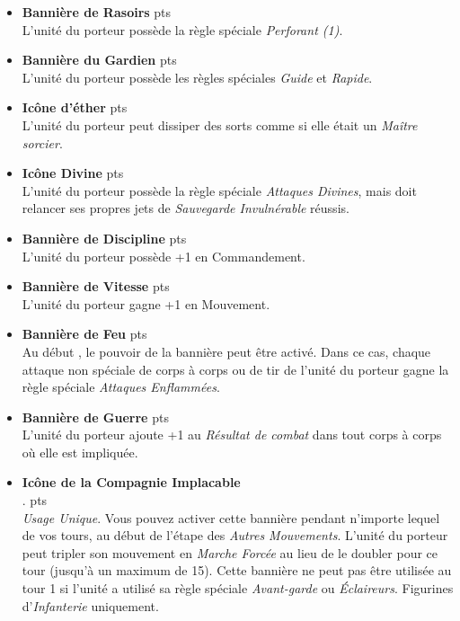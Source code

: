 \begin{multicols}{2}
\begin{itemize}[label={-}]
\item \textbf{Bannière de Rasoirs}  {pts} \\
L'unité du porteur possède la règle spéciale \emph{Perforant (1)}.

\item \textbf{Bannière du Gardien}  {pts} \\
L'unité du porteur possède les règles spéciales \emph{Guide} et \emph{Rapide}.

\item \textbf{Icône d'éther}  {pts} \\
L'unité du porteur peut dissiper des sorts comme si elle était un \emph{Maître sorcier}.

\item \textbf{Icône Divine}  {pts} \\
L'unité du porteur possède la règle spéciale \emph{Attaques Divines}, mais doit relancer ses propres jets de \emph{Sauvegarde Invulnérable} réussis.

\item \textbf{Bannière de Discipline}  {pts} \\
L'unité du porteur possède +1 en Commandement.

\item \textbf{Bannière de Vitesse}  {pts} \\
L'unité du porteur gagne +1 en Mouvement.

\item \textbf{Bannière de Feu}  {pts} \\
Au début , le pouvoir de la bannière peut être activé. Dans ce cas, chaque attaque non spéciale de corps à corps ou de tir de l'unité du porteur gagne la règle spéciale \emph{Attaques Enflammées}.

\item \textbf{Bannière de Guerre}  {pts} \\
L'unité du porteur ajoute +1 au \emph{Résultat de combat} dans tout corps à corps où elle est impliquée.

\medskip
\item \textbf{Icône de la Compagnie Implacable} \\ . {pts} \\
\emph{Usage Unique}. Vous pouvez activer cette bannière pendant n'importe lequel de vos tours, au début de l'étape des \emph{Autres Mouvements}. L'unité du porteur peut tripler son mouvement en \emph{Marche Forcée} au lieu de le doubler pour ce tour (jusqu'à un maximum de \unit{15}{\pouce}). Cette bannière ne peut pas être utilisée au tour 1 si l'unité a utilisé sa règle spéciale \emph{Avant-garde} ou \emph{Éclaireurs}. Figurines d'\emph{Infanterie} uniquement.


\end{itemize}
\end{multicols}
